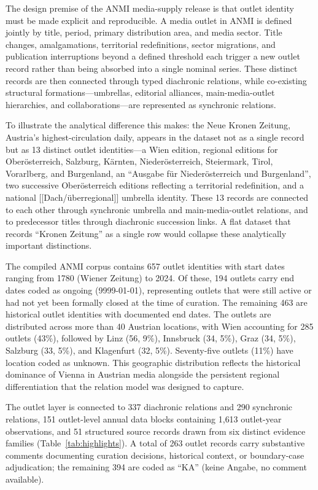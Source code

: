 \documentclass[11pt]{article}
\begin{document}
The design premise of the ANMI media-supply release is that outlet identity must be made explicit and reproducible. A media outlet in ANMI is defined jointly by title, period, primary distribution area, and media sector. Title changes, amalgamations, territorial redefinitions, sector migrations, and publication interruptions beyond a defined threshold each trigger a new outlet record rather than being absorbed into a single nominal series. These distinct records are then connected through typed diachronic relations, while co-existing structural formations---umbrellas, editorial alliances, main-media-outlet hierarchies, and collaborations---are represented as synchronic relations.

To illustrate the analytical difference this makes: the Neue Kronen Zeitung, Austria's highest-circulation daily, appears in the dataset not as a single record but as 13 distinct outlet identities---a Wien edition, regional editions for Ober\"osterreich, Salzburg, K\"arnten, Nieder\"osterreich, Steiermark, Tirol, Vorarlberg, and Burgenland, an ``Ausgabe f\"ur Nieder\"osterreich und Burgenland'', two successive Ober\"osterreich editions reflecting a territorial redefinition, and a national [[Dach/\"uberregional]] umbrella identity. These 13 records are connected to each other through synchronic umbrella and main-media-outlet relations, and to predecessor titles through diachronic succession links. A flat dataset that records ``Kronen Zeitung'' as a single row would collapse these analytically important distinctions.

The compiled ANMI corpus contains 657 outlet identities with start dates ranging from 1780 (Wiener Zeitung) to 2024. Of these, 194 outlets carry end dates coded as ongoing (9999-01-01), representing outlets that were still active or had not yet been formally closed at the time of curation. The remaining 463 are historical outlet identities with documented end dates. The outlets are distributed across more than 40 Austrian locations, with Wien accounting for 285 outlets (43\%), followed by Linz (56, 9\%), Innsbruck (34, 5\%), Graz (34, 5\%), Salzburg (33, 5\%), and Klagenfurt (32, 5\%). Seventy-five outlets (11\%) have location coded as unknown. This geographic distribution reflects the historical dominance of Vienna in Austrian media alongside the persistent regional differentiation that the relation model was designed to capture.

The outlet layer is connected to 337 diachronic relations and 290 synchronic relations, 151 outlet-level annual data blocks containing 1{,}613 outlet-year observations, and 51 structured source records drawn from six distinct evidence families (Table~\ref{tab:highlights}). A total of 263 outlet records carry substantive comments documenting curation decisions, historical context, or boundary-case adjudication; the remaining 394 are coded as ``KA'' (keine Angabe, no comment available).
\end{document}
